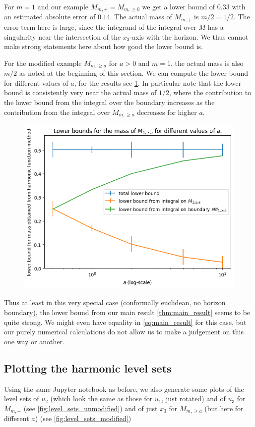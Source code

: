 \documentclass[titlepage,numbers=noenddot,headinclude,oneside,%
footinclude=true,cleardoublepage=empty,%
BCOR=5mm,paper=a4,fontsize=11pt,%
english,%
]{scrartcl}
\begin{document}
For \( m=1 \) and our example \( M_{m,+}=M_{m,\geq 0} \) we get a lower bound of \( 0.33 \) with an estimated absolute error of \( 0.14 \). The actual mass of \( M_{m,+} \) is \( m/2=1/2 \). The error term here is large, since the integrand of the integral over \( M \) has a singularity near the intersection of the \( x_3 \)-axis with the horizon. We thus cannot make strong statements here about how good the lower bound is.

For the modified example \( M_{m,\geq a} \) for \( a>0 \) and \( m=1 \), the actual mass is also \( m/2 \) as noted at the beginning of this section. We can compute the lower bound for different values of \( a \), for the results see \cref{fig:lower_bounds_for_different_values_of_a}. In particular note that the lower bound is consistently very near the actual mass of \( 1/2 \), where the contribution to the lower bound from the integral over the boundary increases as the contribution from the integral over \( M_{m,\geq a} \) decreases for higher \( a \). 

\begin{figure}
    \centering
    \includegraphics[width=0.5\linewidth]{figures/lower_bounds_for_different_values_of_a.png}
    \caption{}
    \label{fig:lower_bounds_for_different_values_of_a}
\end{figure}

Thus at least in this very special case (conformally euclidean, no horizon boundary), the lower bound from our main result \cref{thm:main_result} seems to be quite strong. We might even have equality in \cref{eq:main_result} for this case, but our purely numerical calculations do not allow us to make a judgement on this one way or another.

\subsection{Plotting the harmonic level sets}
Using the same Jupyter notebook \parencite{fischerhenryrubenHarmonicFunctionMethod2023} as before, we also generate some plots of the level sets of \( u_2 \) (which look the same as those for \( u_1 \), just rotated) and of \( u_3 \) for \( M_{m,+} \) (see \cref{fig:level_sets_unmodified}) and of just \( x_3 \) for \( M_{m,\geq a} \) (but here for different \( a \)) (see \cref{fig:level_sets_modified})
\end{document}
